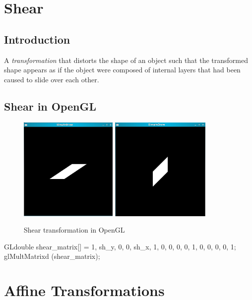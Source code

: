 \documentclass[a4paper,12pt,titlepage,twosided]{article}
\begin{document}
\pagebreak
\section{Shear}
	\subsection{Introduction}
	A \emph{transformation} that distorts the shape of an object such that the transformed shape appears as if the object were composed of internal layers that had been caused to slide over each other.

	\subsection{Shear in OpenGL}
	
	\begin{figure}
		\centering
		\includegraphics[height=50mm]{Images_final/shear_square.jpg}
		\includegraphics[height=50mm]{Images_final/shear_square_along_y.jpg}
		\caption{Shear transformation in OpenGL}
		\label{fig:shear}
	\end{figure}

	\begin{code}
		GLdouble shear_matrix[] = {1,    sh_y,  0,   0, 
					   sh_x, 1,     0,   0, 
					   0,    0,     1,   0, 
					   0,    0,     0,   1};
		glMultMatrixd (shear_matrix);
	\end{code}


\pagebreak
\section{Affine Transformations}
\end{document}
